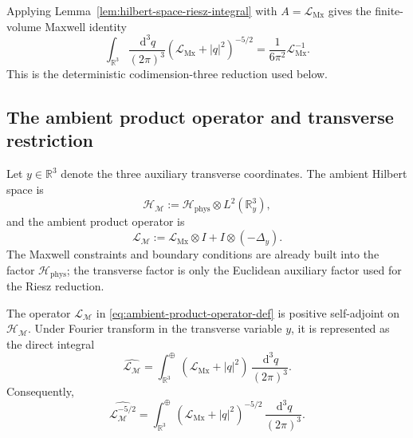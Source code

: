 \documentclass[11pt]{article}
\providecommand{\R}{\mathbb{R}}
\providecommand{\dd}{\,\mathrm{d}}
\providecommand{\abs}[1]{\left\lvert #1\right\rvert}
\providecommand{\Hphys}{\mathcal H_{\mathrm{phys}}}
\providecommand{\LMx}{\mathcal L_{\mathrm{Mx}}}
\providecommand{\Lamb}{\mathcal L_{\mathcal M}}
\numberwithin{equation}{section}
\begin{document}
Applying Lemma~\ref{lem:hilbert-space-riesz-integral} with \(A=\LMx\) gives
the finite-volume Maxwell identity
\begin{equation}
    \int_{\R^3}\frac{\dd^3 q}{(2\pi)^3}
    (\LMx+\abs{q}^2)^{-5/2}
    =
    \frac{1}{6\pi^2}\LMx^{-1}.
    \label{eq:riesz-five-halves-LMx}
\end{equation}
This is the deterministic codimension-three reduction used below.

\subsection{The ambient product operator and transverse restriction}
\label{subsec:ambient-product-brane-restriction}

Let \(y\in\R^3\) denote the three auxiliary transverse coordinates.  The ambient
Hilbert space is
\begin{equation}
    \mathcal H_{\mathcal M}
    :=
    \Hphys\otimes L^2(\R^3_y),
    \label{eq:ambient-H-def-section04}
\end{equation}
and the ambient product operator is
\begin{equation}
    \Lamb
    :=
    \LMx\otimes I
    +
    I\otimes(-\Delta_y).
    \label{eq:ambient-product-operator-def}
\end{equation}
The Maxwell constraints and boundary conditions are already built into the
factor \(\Hphys\); the transverse factor is only the Euclidean auxiliary factor
used for the Riesz reduction.

\begin{proposition}
\label{prop:ambient-product-operator-section04}
The operator \(\Lamb\) in \eqref{eq:ambient-product-operator-def} is positive
self-adjoint on \(\mathcal H_{\mathcal M}\).  Under Fourier transform in the
transverse variable \(y\), it is represented as the direct integral
\begin{equation}
    \widehat{\Lamb}
    =
    \int_{\R^3}^{\oplus}
    (\LMx+\abs{q}^2)\,
    \frac{\dd^3q}{(2\pi)^3} .
    \label{eq:direct-integral-Lamb}
\end{equation}
Consequently,
\begin{equation}
    \widehat{\Lamb^{-5/2}}
    =
    \int_{\R^3}^{\oplus}
    (\LMx+\abs{q}^2)^{-5/2}\,
    \frac{\dd^3q}{(2\pi)^3} .
    \label{eq:direct-integral-Lamb-minus-five-halves}
\end{equation}
\end{proposition}
\end{document}
